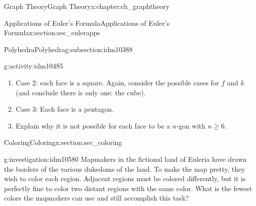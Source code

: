 \documentclass[oneside,10pt,]{book}
\numberwithin{equation}{chapter}
\begin{document}
\begin{chapterptx}{Graph Theory}{}{Graph Theory}{}{}{x:chapter:ch_graphtheory}
\begin{sectionptx}{Applications of Euler's Formula}{}{Applications of Euler's Formula}{}{}{x:section:sec_eulerapps}
\begin{subsectionptx}{Polyhedra}{}{Polyhedra}{}{}{g:subsection:idm10388}
\begin{activity}{}{g:activity:idm10485}
\begin{enumerate}[font=\bfseries,label=(\alph*),ref=\alph*]
\item{}Case 2: each face is a square.  Again, consider the possible cases for \(f\) and \(k\) (and conclude there is only one: the cube).%
\item{}Case 3: Each face is a pentagon.%
\item{}Explain why it is not possible for each face to be a \(n\)-gon with \(n \ge 6\).%
\end{enumerate}
\end{activity}
%
\end{subsectionptx}
\end{sectionptx}
%
%
\typeout{************************************************}
\typeout{************************************************}
%
\begin{sectionptx}{Coloring}{}{Coloring}{}{}{x:section:sec_coloring}
\begin{introduction}{}%
\begin{investigation}{}{g:investigation:idm10580}%
Mapmakers in the fictional land of Euleria have drawn the borders of the various dukedoms of the land. To make the map pretty, they wish to color each region. Adjacent regions must be colored differently, but it is perfectly fine to color two distant regions with the same color. What is the fewest colors the mapmakers can use and still accomplish this task?%
\begin{sidebyside}{1}{0.25}{0.25}{0}%
\begin{sbspanel}{0.5}%
\end{sbspanel}
\end{sidebyside}
\end{investigation}
\end{introduction}
\end{sectionptx}
\end{chapterptx}
\end{document}
